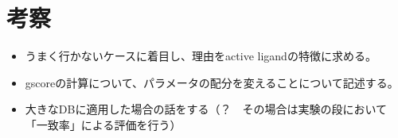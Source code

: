 \chapter{考察}
\begin{itemize}
\item うまく行かないケースに着目し、理由をactive ligandの特徴に求める。
\item gscoreの計算について、パラメータの配分を変えることについて記述する。
\item 大きなDBに適用した場合の話をする（？　その場合は実験の段において「一致率」による評価を行う）
\end{itemize}
